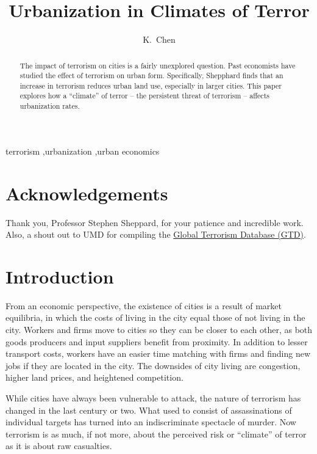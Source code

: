 \documentclass[preprint,2p,12pt]{elsarticle}
\begin{document}
\begin{frontmatter}
\title{Urbanization in Climates of Terror}
\author[kevin]{K.~Chen}
\address[kevin]{Williams College}

\begin{abstract}
The impact of terrorism on cities is a fairly unexplored question.
Past economists have studied the effect of terrorism on urban form.
Specifically, Shepphard finds that an increase in terrorism reduces urban land use, especially in larger cities.
This paper explores how a ``climate'' of terror -- the  persistent threat of terrorism -- affects urbanization rates.
\end{abstract}

\begin{keyword}
terrorism \sep urbanization \sep urban economics
\end{keyword}

\end{frontmatter}

\doublespacing

\section*{\sc Acknowledgements}
Thank you, Professor Stephen Sheppard, for your patience and incredible work.
Also, a shout out to UMD for compiling the \href{http://www.start.umd.edu/gtd}{Global Terrorism Database (GTD)}. 


\section{\sc Introduction}
From an economic perspective, the existence of cities is a result of market equilibria, in which the costs of living in the city equal those of not living in the city.
Workers and firms move to cities so they can be closer to each other, as both goods producers and input suppliers benefit from proximity.
In addition to lesser transport costs, workers have an easier time matching with firms and finding new jobs if they are located in the city.
The downsides of city living are congestion, higher land prices, and heightened competition.

While cities have always been vulnerable to attack, the nature of terrorism has changed in the last century or two.
What used to consist of assassinations of individual targets has turned into an indiscriminate spectacle of murder.
Now terrorism is as much, if not more, about the perceived risk or ``climate'' of terror as it is about raw casualties.
\end{document}
